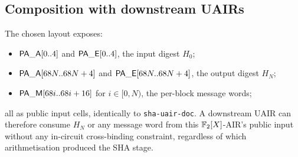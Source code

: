 \subsection{Composition with downstream UAIRs}

The chosen layout exposes:
\begin{itemize}
\item $\mathsf{PA\_A}[0..4]$ and $\mathsf{PA\_E}[0..4]$, the
input digest $H_0$;
\item $\mathsf{PA\_A}[68N..68N+4]$ and $\mathsf{PA\_E}[68N..68N+4]$,
the output digest $H_N$;
\item $\mathsf{PA\_M}[68i..68i+16]$ for $i \in [0,N)$, the per-block
message words;
\end{itemize}
all as public input cells, identically to \texttt{sha-uair-doc}.
A downstream UAIR can therefore consume $H_N$ or any message word
from this $\mathbb{F}_2[X]$-AIR's public input without any in-circuit
cross-binding constraint, regardless of which arithmetisation produced
the SHA stage.
